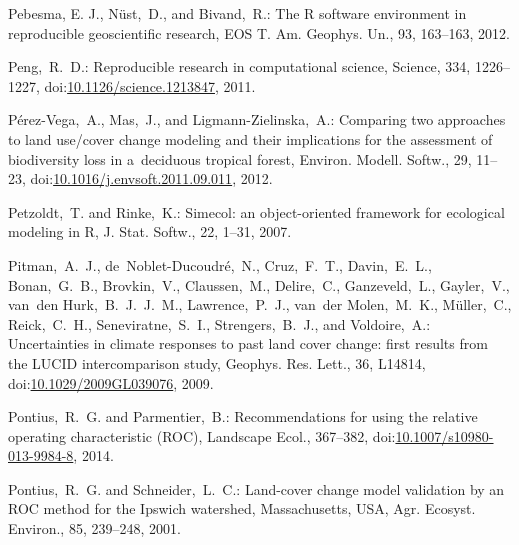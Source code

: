 \documentclass[gmdd, online, hvmath]{copernicus}
\begin{document}
\begin{thebibliography}{97}
   Pebesma, E. J., N\"{u}st,~D., and Bivand,~R.:
    The R software environment in reproducible geoscientific research,
    EOS T. Am. Geophys. Un., 93, 163--163, 2012.

   Peng,~R.~D.: Reproducible research
    in computational science, Science, 334, 1226--1227,
    doi:\href{http://dx.doi.org/10.1126/science.1213847}{10.1126/science.1213847}, 2011.


   {P\'{e}rez-Vega},~A.,
    Mas,~J., and {Ligmann-Zielinska},~A.: Comparing two approaches to
    land use/cover change modeling and their implications for the
    assessment of biodiversity loss in a~deciduous tropical forest,
    Environ. Modell. Softw., 29, 11--23,
    doi:\href{http://dx.doi.org/10.1016/j.envsoft.2011.09.011}{10.1016/j.envsoft.2011.09.011}, 2012.


   Petzoldt,~T. and
    Rinke,~K.: Simecol: an object-oriented framework for ecological
    modeling in R, J. Stat. Softw., 22, 1--31, 2007.


    Pitman,~A.~J., de~{Noblet-Ducoudr\'{e}},~N., Cruz,~F.~T.,
    Davin,~E.~L., Bonan,~G.~B., Brovkin,~V., Claussen,~M., Delire,~C.,
    Ganzeveld,~L., Gayler,~V., van~den Hurk,~B.~J.~J.~M.,
    Lawrence,~P.~J., van~der Molen,~M.~K., M\"{u}ller,~C.,
    Reick,~C.~H., Seneviratne,~S.~I., Strengers,~B.~J., and
    Voldoire,~A.: Uncertainties in climate responses to past land
    cover change: first results from the {LUCID} intercomparison
    study, Geophys. Res. Lett., 36,  L14814,
doi:\href{http://dx.doi.org/10.1029/2009GL039076}{10.1029/2009GL039076},
    2009.


    Pontius,~R.~G. and Parmentier,~B.: Recommendations for using the
    relative operating characteristic {(ROC)}, Landscape Ecol., 367--382,
    doi:\href{http://dx.doi.org/10.1007/s10980-013-9984-8}{10.1007/s10980-013-9984-8},
    2014.


    Pontius,~R.~G. and Schneider,~L.~C.: Land-cover change model
    validation by an {ROC} method for the Ipswich watershed,
    Massachusetts, {USA}, Agr. Ecosyst. Environ., 85, 239--248, 2001.



\end{thebibliography}
\end{document}
